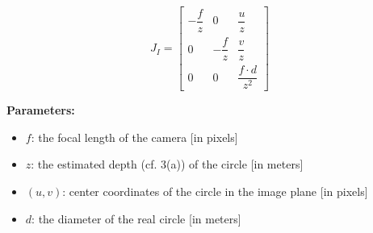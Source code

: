 \documentclass[a4paper,10pt]{article}
\begin{document}
$$J_{I} = \begin{bmatrix}
	-\dfrac{f}{z} & 0 & \dfrac{u}{z}\\[2ex]
	0 & -\dfrac{f}{z} & \dfrac{v}{z}\\[2ex]
	0 & 0 & \dfrac{f \cdot d}{z^2}
\end{bmatrix}$$

\textbf{Parameters:}
\begin{itemize}
	\item $f$: the focal length of the camera [in pixels]
	\item $z$: the estimated depth (cf. 3(a)) of the circle [in meters]
	\item $(u, v)$: center coordinates of the circle in the image plane [in pixels]
	\item $d$: the diameter of the real circle [in meters]
\end{itemize}
\end{document}
